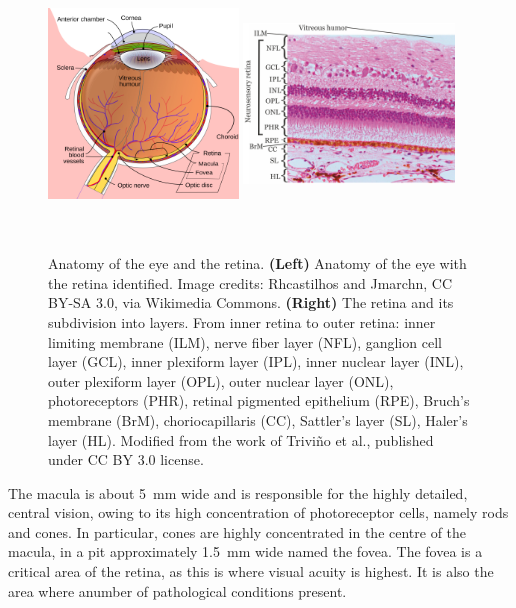 \documentclass[12pt,a4paper]{journal}
\begin{document}
\begin{figure}[hb]
  \centering
  \includegraphics[width=0.45\textwidth, height=7cm]{ArchitectureEye} %
  \hfill
  \includegraphics[width=0.5\textwidth, height=7cm]{RetinalLayers2}
  \caption{Anatomy of the eye and the retina. \textbf{(Left)} Anatomy of the eye with the retina identified. Image credits: Rhcastilhos and Jmarchn, CC BY-SA 3.0, via Wikimedia Commons. \textbf{(Right)} The retina and its subdivision into layers. From inner retina to outer retina: inner limiting membrane (ILM), nerve fiber layer (NFL), ganglion cell layer (GCL), inner plexiform layer (IPL), inner nuclear layer (INL), outer plexiform layer (OPL), outer nuclear layer (ONL), photoreceptors (PHR), retinal pigmented epithelium (RPE), Bruch's membrane (BrM), choriocapillaris (CC), Sattler's layer (SL), Haler's layer (HL). Modified from the work of Trivi\~no et al., published under CC BY 3.0 license.~\cite{Trivino_2012}}
  \label{fig:architecture-eye}
\end{figure}

The macula is about \SI{5}{\mm} wide and is responsible for the highly detailed, central vision, owing to its high concentration of photoreceptor cells, namely rods and cones.
In particular, cones are highly concentrated in the centre of the macula, in a pit approximately \SI{1.5}{\mm} wide named the fovea.
The fovea is a critical area of the retina, as this is where visual acuity is highest. It is also the area where anumber of pathological conditions present.
\end{document}
